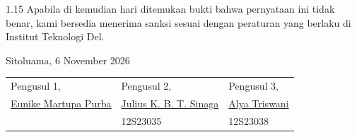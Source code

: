 \begin{spacing}{1.15}
\noindent Apabila di kemudian hari ditemukan bukti bahwa pernyataan ini tidak benar, kami bersedia menerima sanksi sesuai dengan peraturan yang berlaku di Institut Teknologi Del.

\vspace{0.3cm}
\begin{flushright}
  Sitoluama, 6 November 2026
\end{flushright}

\noindent
\begin{tabularx}{\textwidth}{>{\centering\arraybackslash}X>{\centering\arraybackslash}X>{\centering\arraybackslash}X}
  Pengusul 1, & Pengusul 2, & Pengusul 3, \\[2cm]
  \underline{Eunike Martupa Purba} & \underline{Julius K. B. T. Sinaga} & \underline{Alya Triswani} \\
  {12S23021} & {12S23035} & {12S23038} \\
\end{tabularx}
\end{spacing}
